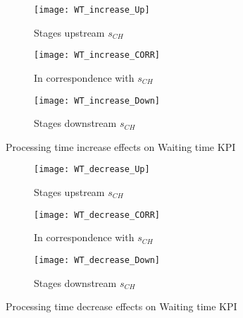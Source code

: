 \begin{landscape}
\begin{figure}[p]
  \centering
  \begin{subfigure}[t]{0.4\textwidth}
    \texttt{[image: WT\_increase\_Up]}
    \caption{Stages upstream $s_{CH}$}
    \label{fig:Processing time increase effects on Waiting time KPI - Stages upstream}   
  \end{subfigure}
  \begin{subfigure}[t]{0.4\textwidth}
    \texttt{[image: WT\_increase\_CORR]}
    \caption{In correspondence with $s_{CH}$}
    \label{fig:Processing time increase effects on Waiting time KPI - In correspondence with}   
  \end{subfigure}
  \begin{subfigure}[t]{0.4\textwidth}
    \texttt{[image: WT\_increase\_Down]}
    \caption{Stages downstream $s_{CH}$}
    \label{fig:Processing time increase effects on Waiting time KPI - Stages downstream}   
  \end{subfigure}
  \caption{Processing time increase effects on Waiting time KPI}
  \label{fig:Processing time increase effects on Waiting time KPI}
\end{figure}
\begin{figure}[p]
  \centering
  \begin{subfigure}[b]{0.4\textwidth}
    \texttt{[image: WT\_decrease\_Up]}
    \caption{Stages upstream $s_{CH}$}
    \label{fig:Processing time decrease effects on Waiting time KPI - Stages upstream}   
  \end{subfigure}
  \begin{subfigure}[b]{0.4\textwidth}
    \texttt{[image: WT\_decrease\_CORR]}
    \caption{In correspondence with $s_{CH}$}
    \label{fig:Processing time decrease effects on Waiting time KPI - In correspondence with}   
  \end{subfigure}
  \begin{subfigure}[b]{0.4\textwidth}
    \texttt{[image: WT\_decrease\_Down]}
    \caption{Stages downstream $s_{CH}$}
    \label{fig:Processing time decrease effects on Waiting time KPI - Stages downstream}   
  \end{subfigure}
  \caption{Processing time decrease effects on Waiting time KPI}
  \label{fig:Processing time decrease effects on Waiting time KPI}
\end{figure}
\end{landscape}
